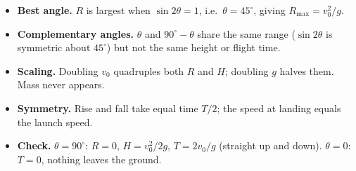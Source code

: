 \documentclass[10pt]{article}
\begin{document}
\begin{tcolorbox}[colback=green!5, colframe=green!40!black, title={What the formulas say}, boxsep=2pt, top=2pt, bottom=2pt]
\begin{itemize}
  \setlength{\itemsep}{2pt}
  \item \textbf{Best angle.} $R$ is largest when $\sin 2\theta = 1$, i.e.\ $\theta = 45^\circ$, giving $R_{\max} = v_0^2/g$.
  \item \textbf{Complementary angles.} $\theta$ and $90^\circ-\theta$ share the same range ($\sin 2\theta$ is symmetric about $45^\circ$) but not the same height or flight time.
  \item \textbf{Scaling.} Doubling $v_0$ quadruples both $R$ and $H$; doubling $g$ halves them. Mass never appears.
  \item \textbf{Symmetry.} Rise and fall take equal time $T/2$; the speed at landing equals the launch speed.
  \item \textbf{Check.} $\theta = 90^\circ$: $R = 0$, $H = v_0^2/2g$, $T = 2v_0/g$ (straight up and down). $\theta = 0$: $T = 0$, nothing leaves the ground.
\end{itemize}
\end{tcolorbox}
\end{document}
